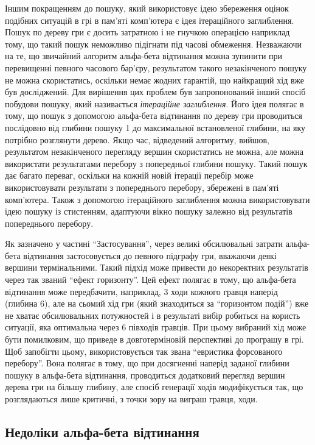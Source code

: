 \documentclass[12pt,a4paper]{article}
\begin{document}
Іншим покращенням до пошуку, який використовує ідею збереження оцінок подібних
ситуацій в грі в пам'яті комп'ютера є ідея ітераційного заглиблення. Пошук по
дереву гри є досить затратною і не гнучкою операцією наприклад тому, що такий
пошук неможливо підігнати під часові обмеження. Незважаючи на те, що звичайний
алгоритм альфа-бета відтинання можна зупинити при перевищенні певного часового
бар'єру, результатом такого незакінченого пошуку не можна скористатись,
оскільки немає жодних гарантій, що найкращий хід вже був досліджений. Для
вирішення цих проблем був запропонований інший спосіб побудови пошуку, який
називається \textit{ітераційне заглиблення}. Його ідея полягає в тому, що
пошук з допомогою альфа-бета відтинання по дереву гри проводиться послідовно
від глибини пошуку 1 до максимальної встановленої глибини, на яку потрібно
розглянути дерево. Якщо час, відведений алгоритму, вийшов, результатом
незакінченого перегляду вершин скористатись не можна, але можна використати
результатами перебору з попередньої глибини пошуку. Такий пошук дає багато
переваг, оскільки на кожній новій ітерації перебір може використовувати
результати з попереднього перебору, збережені в пам'яті комп'ютера. Також з
допомогою ітераційного заглиблення можна використовувати ідею пошуку із
стистенням, адаптуючи вікно пошуку залежно від результатів попереднього
перебору.

Як зазначено у частині ``Застосування'', через великі обсилювальні затрати
альфа-бета відтинання застосовується до певного підграфу гри, вважаючи деякі
вершини термінальними. Такий підхід може привести до некоректних результатів
через так званий ``ефект горизонту''. Цей ефект полягає в тому, що альфа-бета
відтинання може передбачити, наприклад, 3 ходи кожного гравця наперід (глибина
6), але на сьомий хід гри (який знаходиться за ``горизонтом подій'') вже не
хватає обсилювальних потужностей і в результаті вибір робиться на користь
ситуації, яка оптимальна через 6 півходів гравців. При цьому вибраний хід може
бути помилковим, що приведе в довготерміновій перспективі до програшу в
грі. Щоб запобігти цьому, використовується так звана ``евристика форсованого
перебору''. Вона полягає в тому, що при досягненні наперід заданої глибини
пошуку в альфа-бета відтинання, проводиться додатковий перегляд вершин дерева
гри на більшу глибину, але спосіб генерації ходів модифікується так, що
розглядаються лише критичні, з точки зору на виграш гравця, ходи.

\subsection{Недоліки альфа-бета відтинання}
\end{document}
